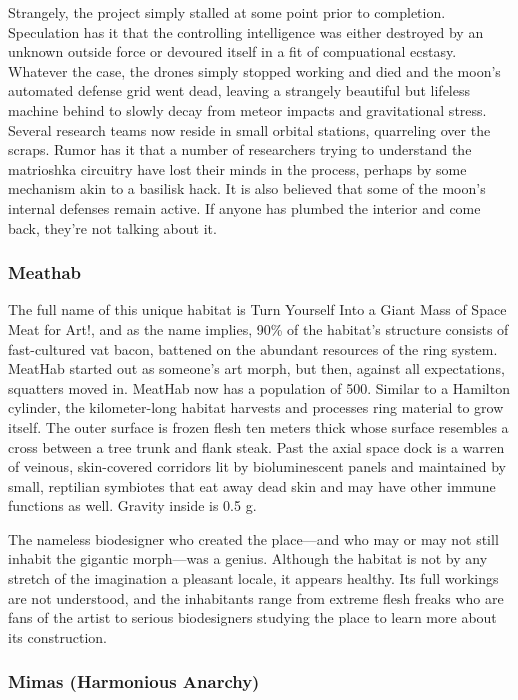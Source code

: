 Strangely, the project simply stalled at some point prior to completion. Speculation has it that the controlling intelligence was either destroyed by an unknown outside force or devoured itself in a fit of compuational ecstasy. Whatever the case, the drones simply stopped working and died and the moon's automated defense grid went dead, leaving a strangely beautiful but lifeless machine behind to slowly decay from meteor impacts and gravitational stress. Several research teams now reside in small orbital stations, quarreling over the scraps. Rumor has it that a number of researchers trying to understand the matrioshka circuitry have lost their minds in the process, perhaps by some mechanism akin to a basilisk hack. It is also believed that some of the moon's internal defenses remain active. If anyone has plumbed the interior and come back, they're not talking about it. 

\subsubsection{Meathab} \label{sec:meathab} 

The full name of this unique habitat is Turn Yourself Into a Giant Mass of Space Meat for Art!, and as the name implies, 90\% of the habitat's structure consists of fast-cultured vat bacon, battened on the abundant resources of the ring system. MeatHab started out as someone's art morph, but then, against all expectations, squatters moved in. MeatHab now has a population of 500. Similar to a Hamilton cylinder, the kilometer-long habitat harvests and processes ring material to grow itself. The outer surface is frozen flesh ten meters thick whose surface resembles a cross between a tree trunk and flank steak. Past the axial space dock is a warren of veinous, skin-covered corridors lit by bioluminescent panels and maintained by small, reptilian symbiotes that eat away dead skin and may have other immune functions as well. Gravity inside is 0.5 g. 

The nameless biodesigner who created the place—and who may or may not still inhabit the gigantic morph—was a genius. Although the habitat is not by any stretch of the imagination a pleasant locale, it appears healthy. Its full workings are not understood, and the inhabitants range from extreme flesh freaks who are fans of the artist to serious biodesigners studying the place to learn more about its construction. 

\subsubsection{Mimas (Harmonious Anarchy)} \label{sec:mimas-harm-anarchy} 

